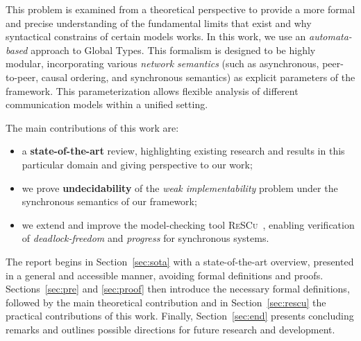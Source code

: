 This problem is examined from a theoretical
perspective to provide a more formal and precise understanding of
the fundamental limits that exist and why syntactical constrains
of certain models works.
In this work, we use an \textit{automata-based} approach to Global Types. 
This formalism is designed to be highly modular, 
incorporating various \textit{network semantics} (such as asynchronous, 
peer-to-peer, causal ordering, and synchronous semantics) as explicit 
parameters of the framework. This parameterization allows flexible 
analysis of different communication models within a unified setting.

The main contributions of this work are: 
\begin{itemize}
    \item a \textbf{state-of-the-art} review, highlighting
    existing research and results in this particular domain and giving
    perspective to our work;
    \item we prove \textbf{undecidability} of the \textit{weak implementability} 
    problem under the synchronous semantics of our framework;
    \item we extend and improve the model-checking tool \textsc{ReSCu}~\cite{rescurepo},  
    enabling verification of \textit{deadlock-freedom} and \textit{progress} 
    for synchronous systems.
\end{itemize}
The report begins in Section~\ref{sec:sota} with a state-of-the-art
overview, presented in a general and accessible manner, avoiding
formal definitions and proofs. Sections~\ref{sec:pre} and
\ref{sec:proof} then introduce the necessary formal definitions,
followed by the main theoretical contribution and in 
Section~\ref{sec:rescu} the practical contributions of
this work. Finally, Section~\ref{sec:end} presents concluding
remarks and outlines possible directions for future research and
development.
